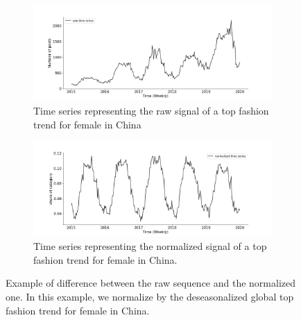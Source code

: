 \documentclass{article} %
\newcommand{\numberts}{10000}
\begin{document}
\begin{figure}
\centering
\begin{subfigure}{1.\textwidth}
  \centering
  \includegraphics[width=1.\linewidth]{figure/cn_female_top_raw}
  \caption{Time series representing the raw signal of a top fashion trend for female in China}
  \label{fig:normalization:sub1}
\end{subfigure}
\begin{subfigure}{1.\textwidth}
  \centering
  \includegraphics[width=1.\linewidth]{figure/cn_female_top_norm}
  \caption{Time series representing the normalized signal of a top fashion trend for female in China.}
  \label{fig:normalization:sub2}
\end{subfigure}
\caption{Example of difference between the raw sequence and the normalized one. In this example, we normalize by the deseasonalized global top fashion trend for female in China.}
\label{fig:normalization}
\end{figure}
\end{document}
